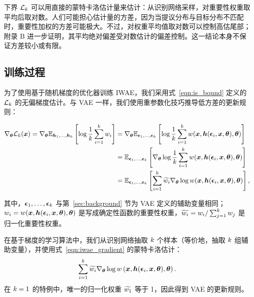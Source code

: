 下界 $\mathcal{L}_{k}$ 可以用直接的蒙特卡洛估计量来估计：从识别网络采样，对重要性权重取平均后取对数。人们可能担心估计量的方差，因为当提议分布与目标分布不匹配时，重要性加权的方差可能极大。不过，对权重平均值取对数可以控制高估尾部；附录 B 进一步证明，其平均绝对偏差受对数估计的偏差控制。这一结论本身不保证方差较小或有限。


\subsection{训练过程}

为了使用基于随机梯度的优化器训练 IWAE，我们采用式~\eqref{eqn:is_bound} 定义的 $\mathcal{L}_{k}$ 的无偏梯度估计。与 VAE 一样，我们使用重参数化技巧推导低方差的更新规则：
\begin{small}
\begin{align}
\nabla_{\bm{\theta}} \mathcal{L}_{k}(\bm{x}) = \nabla_{\bm{\theta}} \mathbb{E}_{\bm{h}_{1},\ldots,\bm{h}_{k}} \left[ \log \frac{1}{k} \sum_{i=1}^k w_{i} \right] 
&= \nabla_{\bm{\theta}} \mathbb{E}_{\bm{\epsilon}_{1},\ldots,\bm{\epsilon}_{k}} \left[ \log \frac{1}{k} \sum_{i=1}^k w(\bm{x}, \bm{h}(\bm{\epsilon}_{i}, \bm{x}, {\bm{\theta}}), {\bm{\theta}}) \right]\label{eq:source-11}
\\
&= \mathbb{E}_{\bm{\epsilon}_{1},\ldots,\bm{\epsilon}_{k}} \left[ \nabla_{\bm{\theta}} \log \frac{1}{k} \sum_{i=1}^k w(\bm{x}, \bm{h}(\bm{\epsilon}_{i}, \bm{x}, {\bm{\theta}}), {\bm{\theta}}) \right]\label{eq:source-12}
\\
&= \mathbb{E}_{\bm{\epsilon}_{1},\ldots,\bm{\epsilon}_{k}} \left[ \sum_{i=1}^k \widetilde{w_{i}} \nabla_{\bm{\theta}} \log w(\bm{x}, \bm{h}(\bm{\epsilon}_{i}, \bm{x}, {\bm{\theta}}), {\bm{\theta}}) \right], \label{eqn:iwae_gradient}
\end{align}
\end{small}

\noindent 其中，$\bm{\epsilon}_{1},\ldots,\bm{\epsilon}_{k}$ 与第~\ref{sec:background} 节为 VAE 定义的辅助变量相同；$w_{i}=w(\bm{x},\bm{h}(\bm{\epsilon}_{i},\bm{x},{\bm{\theta}}),{\bm{\theta}})$ 是写成确定性函数的重要性权重，$\widetilde{w_{i}}=w_{i}/\sum_{j=1}^{k}w_{j}$ 是归一化重要性权重。

在基于梯度的学习算法中，我们从识别网络抽取 $k$ 个样本（等价地，抽取 $k$ 组辅助变量），并使用式~\eqref{eqn:iwae_gradient} 的蒙特卡洛估计：
\begin{equation}
\label{eqn:grad_ksample_objective}
\sum_{i=1}^k \widetilde{w_{i}} \nabla_{{\bm{\theta}}}\log w\left(\bm{x}, \bm{h}(\bm{\epsilon}_{i}, \bm{x}, {\bm{\theta}}), {\bm{\theta}}\right).
\end{equation}
在 $k=1$ 的特例中，唯一的归一化权重 $\widetilde{w_{1}}$ 等于 1，因此得到 VAE 的更新规则。


